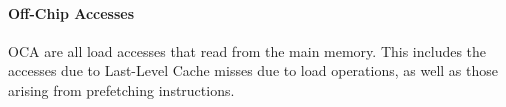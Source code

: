 \paragraph{Off-Chip Accesses} OCA are all load accesses that read from the main
memory.  This includes the accesses due to Last-Level Cache misses due to load
operations, as well as those arising from prefetching instructions.

%
%
%
%
%

